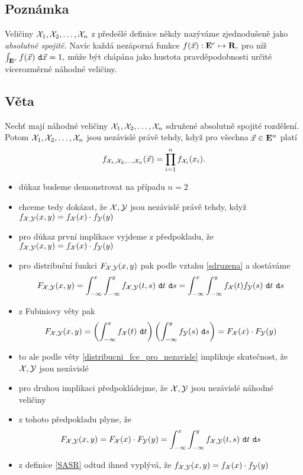 \subsection{Poznámka}

Veli\v ciny ${\mathcal X}_1,{\mathcal X}_2,\ldots,{\mathcal X}_n$ z p\v rede\v sl\'e definice n\v ekdy naz\'yv\'ame zjednodu\v sen\v e jako \emph{absolutn\v e spojit\'e.} Nav\'ic ka\v zd\'a nez\'aporn\'a funkce $f({\vec{x}}):{{\mathbf E}^r}\mapsto{\mathbf R},$ pro n\'i\v z
%
$\int_{{{\mathbf E}^r}} f({\vec{x}})~\mathtt{d}{\vec{x}} = 1,$
%
m\r u\v ze b\'yt ch\'ap\'ana jako hustota pravd\v epodobnosti ur\v
cit\'e v\'icerozm\v ern\'e n\'ahodn\'e veli\v ciny.

\subsection{V\v eta}\label{hustota_4_nezavisle}

Nech\v t maj\'i n\'ahodn\'e veli\v ciny ${\mathcal X}_1,{\mathcal X}_2,\ldots,{\mathcal X}_n$ sdru\v zen\'e absolutn\v e spojit\'e rozd\v elen\'i. Potom ${\mathcal X}_1,{\mathcal X}_2,\ldots,{\mathcal X}_n$ jsou nez\'avisl\'e pr\'av\v e tehdy, kdy\v z pro v\v sechna ${\vec{x}}\in{\mathbf E}^n$ plat\'i
%
$$f_{{\mathcal X}_1,{\mathcal X}_2,\ldots,{\mathcal X}_n}({\vec{x}})=\prod_{i=1}^n f_{{\mathcal X}_i}(x_i).$$

\Proof

\begin{itemize}
\item d\r ukaz budeme demonstrovat na p\v r\'ipadu $n=2$
\item chceme tedy dok\'azat, \v ze ${\mathcal X},{\mathcal Y}$ jsou nez\'avisl\'e pr\'av\v e tehdy, kdy\v z $f_{{\mathcal X},{\mathcal Y}}(x,y)=f_{{\mathcal X}}(x)\cdot f_{{\mathcal Y}}(y)$
\item pro d\r ukaz prvn\'i implikace vyjdeme z p\v redpokladu, \v ze $f_{{\mathcal X},{\mathcal Y}}(x,y)=f_{{\mathcal X}}(x)\cdot f_{{\mathcal Y}}(y)$
\item pro distribu\v cn\'i funkci $F_{{\mathcal X},{\mathcal Y}}(x,y)$ pak podle vztahu \eqref{sdruzena} a dost\'av\'ame $$F_{{\mathcal X},{\mathcal Y}}(x,y)=\int_{-\infty}^{x}\int_{-\infty}^{y} f_{{\mathcal X},{\mathcal Y}}(t,s)~\mathtt{d}t~\mathtt{d}s=\int_{-\infty}^{x}\int_{-\infty}^{y} f_{{\mathcal X}}(t)f_{{\mathcal Y}}(s)~\mathtt{d}t~\mathtt{d}s$$

\item z Fubiniovy v\v ety pak $$F_{{\mathcal X},{\mathcal Y}}(x,y)=\left(\int_{-\infty}^{x}f_{{\mathcal X}}(t)~\mathtt{d}t\right)\left(\int_{-\infty}^{y}f_{{\mathcal Y}}(s)~\mathtt{d}s\right)=F_{{\mathcal X}}(x)\cdot  F_{{\mathcal Y}}(y)$$
\item to ale podle v\v ety \ref{distribucni_fce_pro_nezavisle} implikuje skute\v cnost, \v ze ${\mathcal X},{\mathcal Y}$ jsou nez\'avisl\'e
\item pro druhou implikaci p\v redpokl\'adejme, \v ze ${\mathcal X},{\mathcal Y}$ jsou nez\'avisl\'e n\'ahodn\'e veli\v ciny
\item z tohoto p\v redpokladu plyne, \v ze $$F_{{\mathcal X},{\mathcal Y}}(x,y)= F_{{\mathcal X}}(x) \cdot F_{{\mathcal Y}}(y) = \int_{-\infty}^{x}\int_{-\infty}^{y} f_{{\mathcal X},{\mathcal Y}}(t,s)~\mathtt{d}t~\mathtt{d}s$$
\item z definice \ref{SASR} odtud ihned vypl\'yv\'a, \v ze $f_{{\mathcal X},{\mathcal Y}}(x,y)=f_{{\mathcal X}}(x)\cdot f_{{\mathcal Y}}(y)$


\end{itemize}

